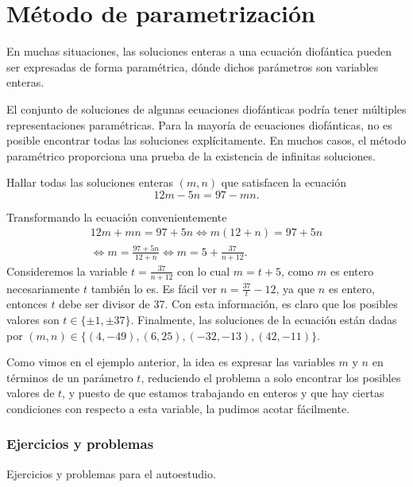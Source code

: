 \section{Método de parametrización}

En muchas situaciones, las soluciones enteras a una ecuación diofántica pueden ser expresadas de forma paramétrica, dónde dichos parámetros son variables enteras.

El conjunto de soluciones de algunas ecuaciones diofánticas podría tener múltiples representaciones paramétricas.
Para la mayoría de ecuaciones diofánticas, no es posible encontrar todas las soluciones explícitamente.
En muchos casos, el método paramétrico proporciona una prueba de la existencia de infinitas soluciones.

\begin{example}
    Hallar todas las soluciones enteras $(m,n)$ que satisfacen la ecuación
    \[
        12m - 5n = 97 - mn.
    \]
\end{example}
\begin{solution}
    Transformando la ecuación convenientemente
    \begin{multline*}
        12m + mn = 97 + 5n \iff
        m(12 + n) = 97 + 5n\\ \iff
        m = \frac{97 + 5n}{12 + n} \iff
        m = 5 + \frac{37}{n + 12}.
    \end{multline*}
    Consideremos la variable $t = \frac{37}{n + 12}$ con lo cual $m = t + 5$, como $m$ es entero necesariamente $t$
    también lo es.
    Es fácil ver $n = \frac{37}{t} - 12$, ya que $n$ es entero, entonces $t$ debe ser divisor de 37.
    Con esta información, es claro que los posibles valores son $t \in \{\pm 1, \pm 37 \}$.
    Finalmente, las soluciones de la ecuación están dadas por $(m,n) \in \{(4, -49), (6, 25), (-32, -13), (42, -11)\}$.
\end{solution}

Como vimos en el ejemplo anterior, la idea es expresar las variables $m$ y $n$ en términos de un parámetro $t$,
reduciendo el problema a solo encontrar los posibles valores de $t$, y puesto de que estamos trabajando en enteros
y que hay ciertas condiciones con respecto a esta variable, la pudimos acotar fácilmente.

\subsubsection{Ejercicios y problemas}

Ejercicios y problemas para el autoestudio.

